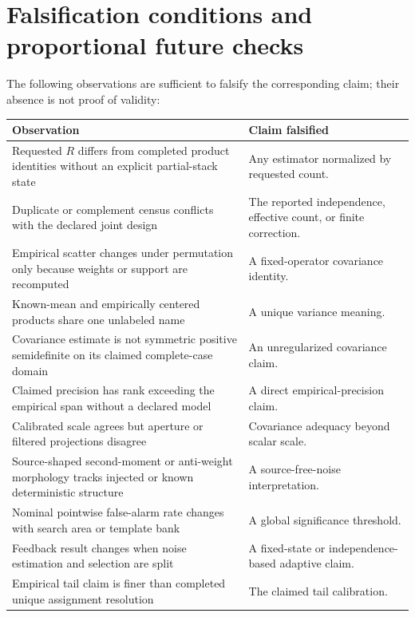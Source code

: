 \documentclass[11pt]{article}
\begin{document}
\section{Falsification conditions and proportional future checks}

The following observations are sufficient to falsify the corresponding claim;
their absence is not proof of validity:
\begin{longtable}{>{\raggedright\arraybackslash}p{}
                  >{\raggedright\arraybackslash}p{}}
\toprule
Observation & Claim falsified \\
\midrule
\endhead
Requested $R$ differs from completed product identities without an explicit
partial-stack state & Any estimator normalized by requested count. \\
Duplicate or complement census conflicts with the declared joint design &
The reported independence, effective count, or finite correction. \\
Empirical scatter changes under permutation only because weights or support
are recomputed & A fixed-operator covariance identity. \\
Known-mean and empirically centered products share one unlabeled name & A
unique variance meaning. \\
Covariance estimate is not symmetric positive semidefinite on its claimed
complete-case domain & An unregularized covariance claim. \\
Claimed precision has rank exceeding the empirical span without a declared
model & A direct empirical-precision claim. \\
Calibrated scale agrees but aperture or filtered projections disagree &
Covariance adequacy beyond scalar scale. \\
Source-shaped second-moment or anti-weight morphology tracks injected or
known deterministic structure & A source-free-noise interpretation. \\
Nominal pointwise false-alarm rate changes with search area or template bank &
A global significance threshold. \\
Feedback result changes when noise estimation and selection are split & A
fixed-state or independence-based adaptive claim. \\
Empirical tail claim is finer than completed unique assignment resolution &
The claimed tail calibration. \\
\bottomrule
\end{longtable}
\end{document}
